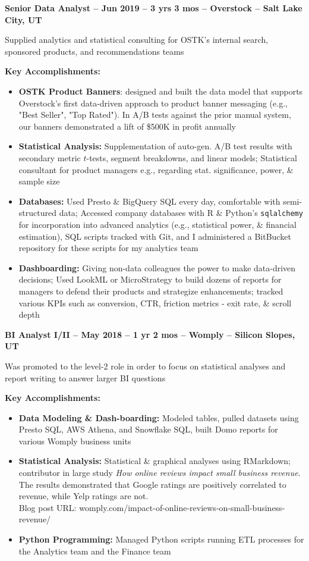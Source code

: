 \documentclass[resmargin, centered, 10pt]{res}
\def \subwidth{13.5cm}
\newcommand{\tab}[1][1cm]{\hspace*{#1}}
\newcommand{\subtext}[1]{\tab[0.5cm] \parbox{\subwidth{}}{#1}}
\begin{document}
\begin{resume}
\textbf{Senior Data Analyst -- Jun 2019 -- 3 yrs 3 mos -- Overstock -- Salt Lake City, UT}

\subtext{Supplied analytics and statistical consulting for OSTK's internal search, sponsored products, and recommendations teams}

\subtext{\textbf{Key Accomplishments:}}

\begin{itemize}
	\item \textbf{OSTK Product Banners}: designed and built the data model that supports Overstock's first data-driven approach to product banner messaging (e.g., "Best Seller", "Top Rated"). In A/B tests against the prior manual system, our banners demonstrated a lift of \$500K in profit annually
	\item \textbf{Statistical Analysis:} Supplementation of auto-gen. A/B test results with secondary metric $t$-tests, segment breakdowns, and linear models; Statistical consultant for product managers e.g., regarding stat. significance, power, \& sample size
	\item \textbf{Databases:} Used Presto \& BigQuery SQL every day, comfortable with semi-structured data; Accessed company databases with R \& Python's \texttt{sqlalchemy} for incorporation into advanced analytics (e.g., statistical power, \& financial estimation), SQL scripts tracked with Git, and I administered a BitBucket repository for these scripts for my analytics team
	\item \textbf{Dashboarding:} Giving non-data colleagues the power to make data-driven decisions; Used LookML or MicroStrategy to build dozens of reports for managers to defend their products and strategize enhancements; tracked various KPIs such as conversion, CTR, friction metrics - exit rate, \& scroll depth
\end{itemize}

\textbf{BI Analyst I/II -- May 2018 -- 1 yr 2 mos -- Womply -- Silicon Slopes, UT}

\subtext{Was promoted to the level-2 role in order to focus on statistical analyses and report writing to answer larger BI questions}

\subtext{\textbf{Key Accomplishments:}}
	
\begin{itemize}
	\item \textbf{Data Modeling \& Dash-boarding:} Modeled tables, pulled datasets using Presto SQL, AWS Athena, and Snowflake SQL, built Domo reports for various Womply business units
	\item \textbf{Statistical Analysis:} Statistical  \& graphical analyses using RMarkdown; contributor in large study \textit{How online reviews impact small business revenue}. The results demonstrated that Google ratings are positively correlated to revenue, while Yelp ratings are not. \\
	Blog post URL: womply.com/impact-of-online-reviews-on-small-business-revenue/
	\item \textbf{Python Programming:} Managed Python scripts running ETL processes for the Analytics team and the Finance team
\end{itemize}


\end{resume}
\end{document}
